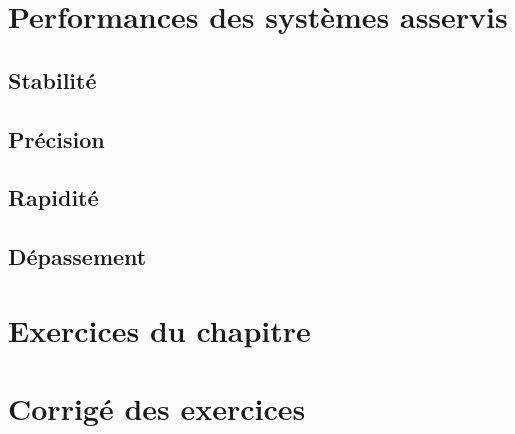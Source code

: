\section{Performances des systèmes asservis}

\subsection{Stabilité}

\subsection{Précision}

\subsection{Rapidité}

\subsection{Dépassement}



\newpage
\section*{Exercices du chapitre}


\exercice{}
\question

\newpage
\section*{Corrigé des exercices}


